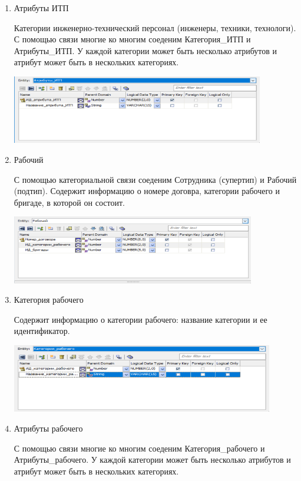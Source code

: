\begin{enumerate}
    \item Атрибуты ИТП

    Категории инженерно-технический персонал (инженеры, техники, технологи).
    С помощью связи многие ко многим соеденим Категория\_ИТП и Атрибуты\_ИТП.
    У каждой категории может быть несколько атрибутов и атрибут может быть в нескольких категориях.

    \includegraphics[height=3cm]{screenshots/entities/attribute_itp.png}

    \item Рабочий

    С помощью категориальной связи соеденим Сотрудника (супертип) и Рабочий (подтип).
    Содержит информацию о номере договра, категории рабочего и бригаде, в которой он состоит.

    \includegraphics[height=3cm]{screenshots/entities/worker.png}

    \item Категория рабочего

    Содержит информацию о категории рабочего: название категории и ее идентификатор.

    \includegraphics[height=3cm]{screenshots/entities/category_worker.png}

    \item Атрибуты рабочего

    С помощью связи многие ко многим соеденим Категория\_рабочего и Атрибуты\_рабочего.
    У каждой категории может быть несколько атрибутов и атрибут может быть в нескольких категориях.


\end{enumerate}
